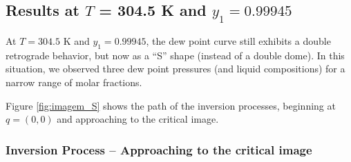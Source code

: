 \documentclass{article}
\theoremstyle{definition}
\theoremstyle{remark}
\begin{document}
%
%
%

\subsection{Results at $T$ = 304.5 K and $y_1 = 0.99945$}

At $T = 304.5$ K and $y_1 = 0.99945$, the dew point curve still exhibits a double retrograde behavior, but now as a ``S'' shape (instead of a double dome). In this situation, we observed three dew point pressures (and liquid compositions) for a narrow range of molar fractions.

Figure \ref{fig:imagem_S} shows the path of the inversion processes, beginning at $q = (0,0)$ and approaching to the critical image.

\subsubsection{Inversion Process -- Approaching to the critical image}
\end{document}
